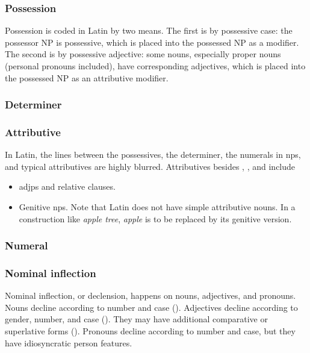 \documentclass{article}
\newcommand*{\corpus}[1]{\emph{#1}}
\begin{document}
\subsubsection{Possession}\label{sec:possessive-abs}

Possession is coded in Latin by two means.
The first is by possessive case: 
the possessor NP is possessive, which is placed into the possessed NP as a modifier.
The second is by possessive adjective:
some nouns, especially proper nouns (personal pronouns included), have corresponding adjectives,
which is placed into the possessed NP as an attributive modifier.

\subsubsection{Determiner}\label{sec:determiner-abs}


\subsubsection{Attributive}

In Latin, the lines between the possessives, 
the determiner, the numerals in \ac{np}s, 
and typical attributives 
are highly blurred.
Attributives besides 
, 
, 
and  include 
\begin{itemize}
    \item \ac{adjp}s and relative clauses. %
    \item Genitive \ac{np}s. Note that Latin does not have simple attributive nouns.
    In a construction like \corpus{apple tree}, \corpus{apple} is to be replaced by its genitive version.
\end{itemize}

\subsubsection{Numeral}\label{sec:numeral-np-abs}



\subsubsection{Nominal inflection}\label{sec:nominal-inflection-abs}

Nominal inflection, or declension, happens on nouns, adjectives, and pronouns.
Nouns decline according to number and case ().
Adjectives decline according to gender, number, and case ().
They may have additional comparative or superlative forms ().
Pronouns decline according to number and case,
but they have idiosyncratic person features.
\end{document}
